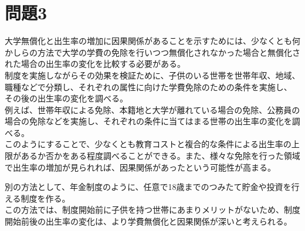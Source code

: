 \documentclass[a4paper,12pt]{ltjsarticle}
\begin{document}
\section*{問題3}
大学無償化と出生率の増加に因果関係があることを示すためには、少なくとも何かしらの方法で大学の学費の免除を行いつつ無償化されなかった場合と無償化された場合の出生率の変化を比較する必要がある。\\
制度を実施しながらその効果を検証ために、子供のいる世帯を世帯年収、地域、職種などで分類し、それぞれの属性に向けた学費免除のための条件を実施し、
その後の出生率の変化を調べる。\\
例えば、世帯年収による免除、本籍地と大学が離れている場合の免除、公務員の場合の免除などを実施し、それぞれの条件に当てはまる世帯の出生率の変化を調べる。\\
このようにすることで、少なくとも教育コストと複合的な条件による出生率の上限があるか否かをある程度調べることができる。また、様々な免除を行った領域で出生率の増加が見られれば、因果関係があったという可能性が高まる。

別の方法として、年金制度のように、任意で18歳までのつみたて貯金や投資を行える制度を作る。\\
この方法では、制度開始前に子供を持つ世帯にあまりメリットがないため、制度開始前後の出生率の変化は、より学費無償化と因果関係が深いと考えられる。
\end{document}
